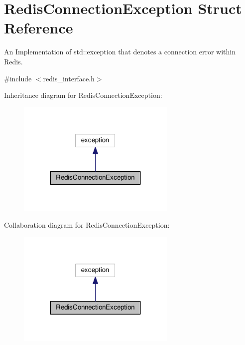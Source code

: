 \hypertarget{structRedisConnectionException}{}\section{Redis\+Connection\+Exception Struct Reference}
\label{structRedisConnectionException}


An Implementation of std\+::exception that denotes a connection error within Redis.  




{\ttfamily \#include $<$redis\+\_\+interface.\+h$>$}



Inheritance diagram for Redis\+Connection\+Exception\+:\nopagebreak
\begin{figure}[H]
\begin{center}
\leavevmode
\includegraphics[width=215pt]{structRedisConnectionException__inherit__graph}
\end{center}
\end{figure}


Collaboration diagram for Redis\+Connection\+Exception\+:\nopagebreak
\begin{figure}[H]
\begin{center}
\leavevmode
\includegraphics[width=215pt]{structRedisConnectionException__coll__graph}
\end{center}
\end{figure}
